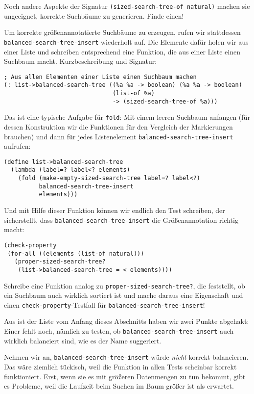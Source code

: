 \begin{aufgabeinline}
  Noch andere Aspekte der Signatur
  \lstinline{(sized-search-tree-of natural)}
  machen sie ungeeignet, korrekte Suchbäume zu generieren.  Finde
  einen!
\end{aufgabeinline}
%
Um korrekte größenannotatierte Suchbäume zu erzeugen, rufen wir
stattdessen \lstinline{balanced-search-tree-insert} wiederholt auf.
Die Elemente dafür holen wir aus einer Liste und schreiben
entsprechend eine Funktion, die aus einer Liste einen Suchbaum macht.
Kurzbeschreibung und Signatur:
%
\begin{lstlisting}
; Aus allen Elementen einer Liste einen Suchbaum machen
(: list->balanced-search-tree ((%a %a -> boolean) (%a %a -> boolean) 
                               (list-of %a)
                               -> (sized-search-tree-of %a)))
\end{lstlisting}
%
Das ist eine typische Aufgabe für \lstinline{fold}: Mit einem leeren
Suchbaum anfangen (für dessen Konstruktion wir die Funktionen für den
Vergleich der Markierungen brauchen) und dann für jedes Listenelement
\lstinline{balanced-search-tree-insert} aufrufen:
%
\begin{lstlisting}
(define list->balanced-search-tree
  (lambda (label=? label<? elements)
    (fold (make-empty-sized-search-tree label=? label<?)
          balanced-search-tree-insert
          elements)))
\end{lstlisting}
%
Und mit Hilfe dieser Funktion können wir endlich den Test schreiben,
der sicherstellt, dass \lstinline{balanced-search-tree-insert} die
Größenannotation richtig macht:
%
\begin{lstlisting}
(check-property
 (for-all ((elements (list-of natural)))
   (proper-sized-search-tree?
    (list->balanced-search-tree = < elements))))
\end{lstlisting}
%
\begin{aufgabeinline}
  Schreibe eine Funktion analog zu
  \lstinline{proper-sized-search-tree?}, die feststellt, ob ein
  Suchbaum auch wirklich sortiert ist und mache daraus eine
  Eigenschaft und einen \lstinline{check-property}-Testfall für
  \lstinline{balanced-search-tree-insert}!
\end{aufgabeinline}
%
Aus ist der Liste vom Anfang dieses Abschnitts haben wir zwei Punkte
abgehakt: Einer fehlt noch, nämlich zu testen, ob
\lstinline{balanced-search-tree-insert} auch wirklich balanciert
sind, wie es der Name suggeriert.

Nehmen wir an, \lstinline{balanced-search-tree-insert} würde
\emph{nicht} korrekt balancieren.  Das wäre ziemlich tückisch, weil
die Funktion in allen Tests scheinbar korrekt funktioniert.  Erst,
wenn sie es mit größeren Datenmengen zu tun bekommt, gibt es Probleme,
weil die Laufzeit beim Suchen im Baum größer ist als erwartet.


